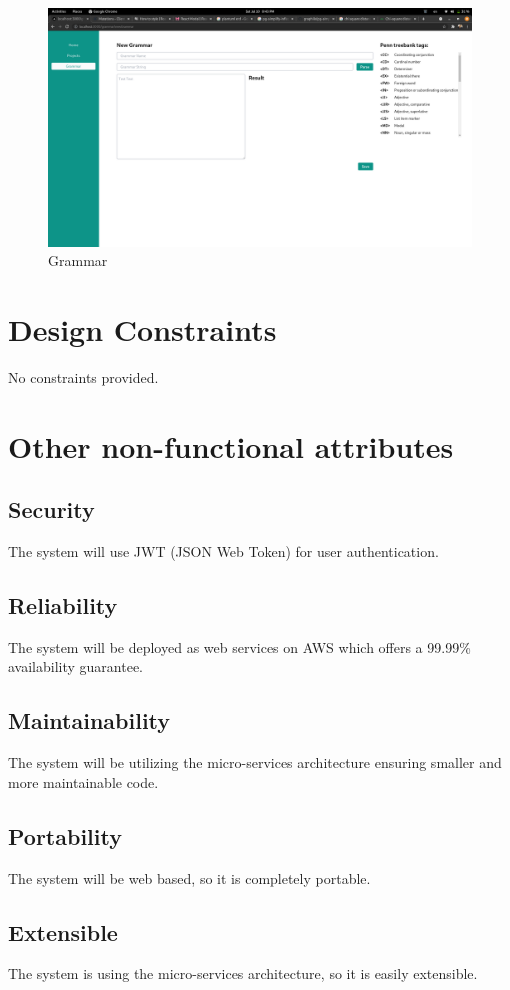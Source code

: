 \begin{figure}[H]
    \includegraphics[width=15cm]{images/Grammar.png}
    \caption{Grammar}
\end{figure}

\section{Design Constraints}
No constraints provided.

\section{Other non-functional attributes}
\subsection {Security}
The system will use JWT (JSON Web Token) for user authentication.
\subsection {Reliability}
The system will be deployed as web services on AWS which offers a 99.99\% availability guarantee.
\subsection {Maintainability}
The system will be utilizing the micro-services architecture ensuring smaller and more maintainable code.
\subsection {Portability}
The system will be web based, so it is completely portable.
\subsection {Extensible}
The system is using the micro-services architecture, so it is easily extensible.
